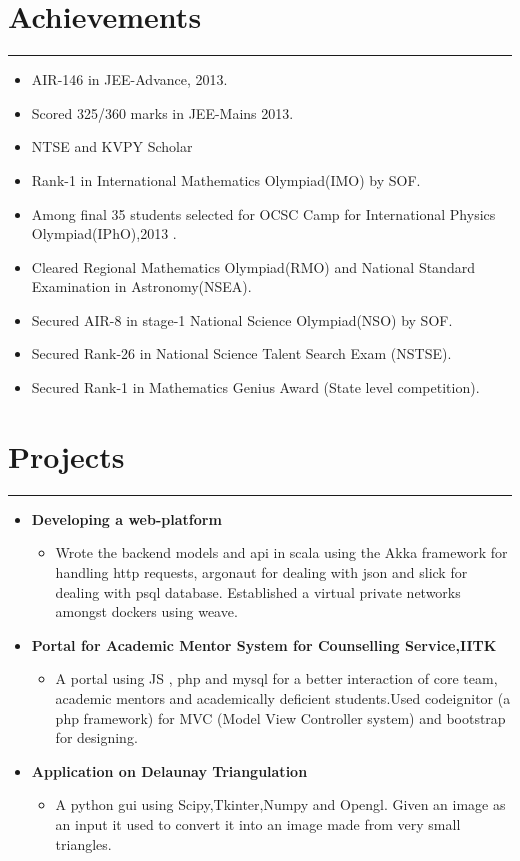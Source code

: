 \documentclass[a4paper]{article}
\begin{document}
 \section*{Achievements}
 \hrule
 \vspace{3mm}
  \begin{itemize}
   \item AIR-146 in JEE-Advance, 2013.	
   \item Scored 325/360 marks in JEE-Mains 2013.
   \item NTSE and KVPY Scholar 
   \item Rank-1 in International Mathematics Olympiad(IMO) by SOF.
   \item Among final 35 students selected for OCSC Camp for International Physics Olympiad(IPhO),2013 .
   \item Cleared Regional Mathematics Olympiad(RMO) and National Standard Examination in Astronomy(NSEA).
   \item Secured AIR-8 in stage-1 National Science Olympiad(NSO) by SOF.
   \item Secured Rank-26 in National Science Talent Search Exam (NSTSE).
   \item Secured Rank-1 in Mathematics Genius Award (State level competition).  
  \end{itemize}
 
 
\section*{Projects}
\hrule
\vspace{3mm}
  \begin{itemize}
  \item
   \textbf{Developing a web-platform}
  \begin{itemize}
	   \item Wrote the backend models and api in scala using the Akka framework for handling http requests, argonaut for dealing with json and slick for dealing with psql database.
        Established a virtual private networks amongst dockers using weave.
    \end{itemize}
   \item 
   \textbf{Portal for Academic Mentor System for Counselling Service,IITK}
	   \begin{itemize}
	    \item A portal using JS , php and mysql for a better interaction of core team, academic mentors and academically 
		  deficient students.Used codeignitor (a php framework) for MVC (Model View Controller system) 
		  and bootstrap for designing.
	   \end{itemize}
    \item
      \textbf{Application on Delaunay  Triangulation}
	\begin{itemize}
	 \item A python gui using Scipy,Tkinter,Numpy and Opengl. 
	      Given an image as an input it used to convert it into an image made from very small triangles.
	\end{itemize}
  \end{itemize}
\end{document}
